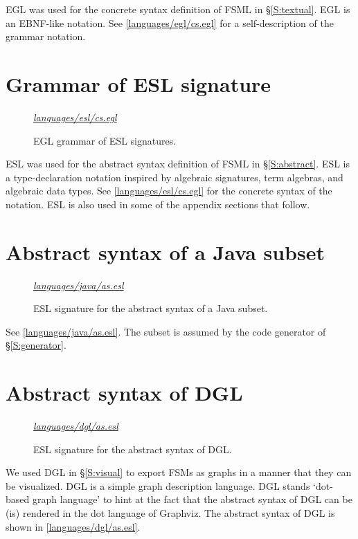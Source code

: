 \documentclass[preprint,authoryear,12pt]{noelsarticle}
\newcommand{\codefigure}[3]{
\begin{figure}[t!]
\begin{boxedminipage}{\hsize}
\mbox{}\hfill{}{\small\textit{\href{http://github.com/slebok/slepro/tree/master/#2}{#2}}}

\end{boxedminipage}
\caption{#1.}
\label{#2}
\medskip
\end{figure}}
\begin{document}
EGL was used for the concrete syntax definition of FSML in
\S\ref{S:textual}. EGL is an EBNF-like notation. See
\autoref{languages/egl/cs.egl} for a self-description of the grammar notation.


\pagebreak

\section{Grammar of ESL signature}
\label{A:esl}

\codefigure{%
EGL grammar of ESL signatures}{%
languages/esl/cs.egl}{%
esl}

ESL was used for the abstract syntax definition of FSML in
\S\ref{S:abstract}. ESL is a type-declaration notation inspired by
algebraic signatures, term algebras, and algebraic data types.  See
\autoref{languages/esl/cs.egl} for the concrete syntax of the
notation. ESL is also used in some of the appendix sections that follow.


\pagebreak

\section{Abstract syntax of a Java subset}
\label{A:java}

\codefigure{%
ESL signature for the abstract syntax of a Java subset}{%
languages/java/as.esl}{%
esl}

See \autoref{languages/java/as.esl}. The subset is assumed by the code
generator of \S\ref{S:generator}.


\pagebreak

\section{Abstract syntax of DGL}
\label{A:dgl}

\codefigure{%
ESL signature for the abstract syntax of DGL}{%
languages/dgl/as.esl}{%
esl}

We used DGL in \S\ref{S:visual} to export FSMs as graphs in a manner
that they can be visualized. DGL is a simple graph description
language. DGL stands `dot-based graph language' to hint at the fact
that the abstract syntax of DGL can be (is) rendered in the dot
language of Graphviz. The abstract syntax of DGL is shown in
\autoref{languages/dgl/as.esl}.

\end{document}
